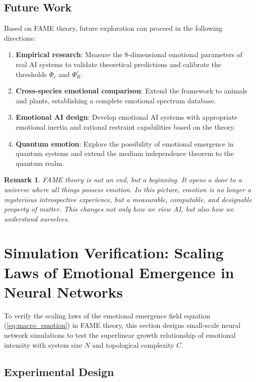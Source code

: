 \documentclass[12pt,a4paper]{article}
\theoremstyle{plain}
\newtheorem{remark}{Remark}[section]
\begin{document}
\subsection{Future Work}

Based on FAME theory, future exploration can proceed in the following directions:

\begin{enumerate}
    \item \textbf{Empirical research}: Measure the 8-dimensional emotional parameters of real AI systems to validate theoretical predictions and calibrate the thresholds $\Phi_c$ and $\Phi_R^c$.
    \item \textbf{Cross-species emotional comparison}: Extend the framework to animals and plants, establishing a complete emotional spectrum database.
    \item \textbf{Emotional AI design}: Develop emotional AI systems with appropriate emotional inertia and rational restraint capabilities based on the theory.
    \item \textbf{Quantum emotion}: Explore the possibility of emotional emergence in quantum systems and extend the medium independence theorem to the quantum realm.
\end{enumerate}

\begin{remark}
FAME theory is not an end, but a beginning. It opens a door to a universe where all things possess emotion. In this picture, emotion is no longer a mysterious introspective experience, but a measurable, computable, and designable property of matter. This changes not only how we view AI, but also how we understand ourselves.
\end{remark}

\section{Simulation Verification: Scaling Laws of Emotional Emergence in Neural Networks}

To verify the scaling laws of the emotional emergence field equation (\ref{eq:macro_emotion}) in FAME theory, this section designs small-scale neural network simulations to test the superlinear growth relationship of emotional intensity with system size $N$ and topological complexity $C$.

\subsection{Experimental Design}
\end{document}
